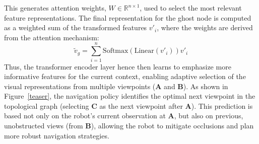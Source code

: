 This generates attention weights, $W \in \mathbb{R}^{n \times 1}$, used to select the most relevant feature representations.
The final representation for the ghost node is computed as a weighted sum of the transformed features $v'_i$, where the weights are derived from the attention mechanism:
\[
\tilde{v}_g = \sum_{i=1}^{n} \text{Softmax}(\text{Linear}(v'_i)) v'_i
\]
Thus, the transformer encoder layer hence then learns to emphasize more informative features for the current context, enabling adaptive selection of the visual representations from multiple viewpoints (\textbf{A} and \textbf{B}). As shown in Figure~\ref{teaser}, the navigation policy identifies the optimal next viewpoint in the topological graph (selecting \textbf{C} as the next viewpoint after \textbf{A}). This prediction is based not only on the robot's current observation at \textbf{A}, but also on previous, unobstructed views (from \textbf{B}), allowing the robot to mitigate occlusions and plan more robust navigation strategies.
